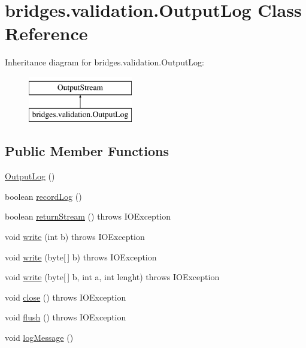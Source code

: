 \hypertarget{classbridges_1_1validation_1_1_output_log}{}\section{bridges.\+validation.\+Output\+Log Class Reference}
\label{classbridges_1_1validation_1_1_output_log}
Inheritance diagram for bridges.\+validation.\+Output\+Log\+:\begin{figure}[H]
\begin{center}
\leavevmode
\includegraphics[height=2.000000cm]{classbridges_1_1validation_1_1_output_log}
\end{center}
\end{figure}
\subsection*{Public Member Functions}
\begin{DoxyCompactItemize}
\item 
\mbox{\hyperlink{classbridges_1_1validation_1_1_output_log_a47a7efee1dce6f11f3de83d48994a56f}{Output\+Log}} ()
\item 
boolean \mbox{\hyperlink{classbridges_1_1validation_1_1_output_log_aae5e41b4b23adb56e3c97d2c17ad0768}{record\+Log}} ()
\item 
boolean \mbox{\hyperlink{classbridges_1_1validation_1_1_output_log_a4ec6037db31ff9dc0664d341183f296f}{return\+Stream}} ()  throws I\+O\+Exception 
\item 
void \mbox{\hyperlink{classbridges_1_1validation_1_1_output_log_a68ed2055f1a0626674675354feeb9d54}{write}} (int b)  throws I\+O\+Exception 
\item 
void \mbox{\hyperlink{classbridges_1_1validation_1_1_output_log_a6489f70aa4e2903456ed05315dd59f31}{write}} (byte\mbox{[}$\,$\mbox{]} b)  throws I\+O\+Exception 
\item 
void \mbox{\hyperlink{classbridges_1_1validation_1_1_output_log_ad0ada8f6ff72218f18b64672690fc94f}{write}} (byte\mbox{[}$\,$\mbox{]} b, int a, int lenght)  throws I\+O\+Exception 
\item 
void \mbox{\hyperlink{classbridges_1_1validation_1_1_output_log_a6ab7881cd35aa11cc830dab4732fe66d}{close}} ()  throws I\+O\+Exception 
\item 
void \mbox{\hyperlink{classbridges_1_1validation_1_1_output_log_ab810fd1e3d7e939bcdf1ec38978c02cd}{flush}} ()  throws I\+O\+Exception 
\item 
void \mbox{\hyperlink{classbridges_1_1validation_1_1_output_log_aea898d0de8715c1451d4731f3d9ae91d}{log\+Message}} ()
\end{DoxyCompactItemize}

